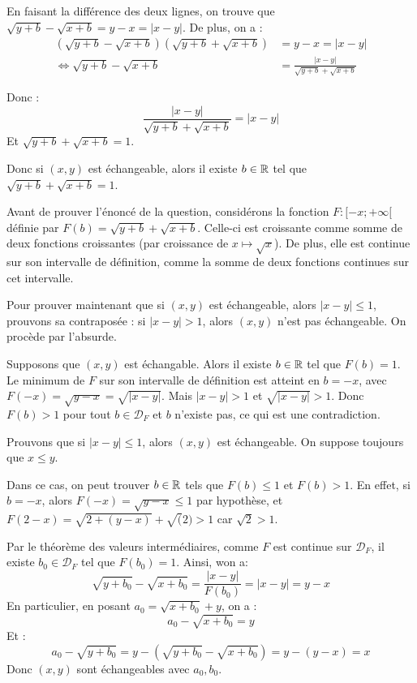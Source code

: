 \documentclass[]{../templates/homework}
\begin{document}
En faisant la différence des deux lignes, on trouve que $\sqrt{y+b} - \sqrt{x+b} = y-x = |x-y|$. De plus, on a :
\begin{equation*}
	\begin{split}
		(\sqrt{y+b} - \sqrt{x+b})(\sqrt{y+b} + \sqrt{x+b}) & =y-x = |x-y|                             \\
		\iff \sqrt{y+b} - \sqrt{x+b}                       & = \frac {|x-y|}{\sqrt{y+b} + \sqrt{x+b}}
	\end{split}
\end{equation*}

Donc : $$\frac {|x-y|}{\sqrt{y+b} + \sqrt{x+b}} = |x-y|$$
Et $\sqrt{y+b} + \sqrt{x+b} = 1$.

Donc si $(x,y)$ est échangeable, alors il existe $b\in\mathbb R$ tel que $\sqrt{y+b} + \sqrt{x+b} = 1$.

Avant de prouver l'énoncé de la question, considérons la fonction $F: [-x;+\infty[$ définie par $F(b) = \sqrt{y+b} + \sqrt{x+b}$. Celle-ci est croissante comme somme de deux fonctions croissantes (par croissance de $x\mapsto \sqrt x$). De plus, elle est continue sur son intervalle de définition, comme la somme de deux fonctions continues sur cet intervalle.

Pour prouver maintenant que si $(x,y)$ est échangeable, alors $|x-y| \leq 1$, prouvons sa contraposée : si $|x-y| > 1$, alors $(x,y)$ n'est pas échangeable. On procède par l'absurde.

Supposons que $(x,y)$ est échangable. Alors il existe $b\in\mathbb R$ tel que $F(b) = 1$. Le minimum de $F$ sur son intervalle de définition est atteint en $b=-x$, avec $F(-x) = \sqrt{y-x} = \sqrt{|x-y|}$. Mais $|x-y| > 1$ et $\sqrt{|x-y|} > 1$. Donc $F(b) > 1$ pour tout $b\in \mathcal D_F$ et $b$ n'existe pas, ce qui est une contradiction.

\subproblem
Prouvons que si $|x-y| \leq 1$, alors $(x,y)$ est échangeable. On suppose toujours que $x \leq y$.

Dans ce cas, on peut trouver $b\in\mathbb R$ tels que $F(b) \leq 1$ et $F(b) > 1$. En effet, si $b=-x$, alors $F(-x) = \sqrt{y-x} \leq 1$ par hypothèse, et $F(2-x) = \sqrt{2+(y-x)} + \sqrt(2) > 1$ car $\sqrt{2} > 1$.

Par le théorème des valeurs intermédiaires, comme $F$ est continue sur $\mathcal D_F$, il existe $b_0 \in \mathcal D_F$ tel que $F(b_0) = 1$. Ainsi, won a:
\begin{equation*}
	\sqrt{y+b_0} - \sqrt{x+b_0} = \frac{|x-y|}{F(b_0)} = |x-y| = y-x
\end{equation*}
En particulier, en posant $a_0 = \sqrt{x+b_0} + y$, on a : $$a_0 - \sqrt{x+b_0} = y$$
Et :$$a_0 - \sqrt{y+b_0} = y - (\sqrt{y+b_0} - \sqrt{x+b_0}) = y - (y-x) = x$$
Donc $(x,y)$ sont échangeables avec $a_0, b_0$.
\end{document}

